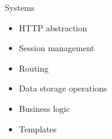 \begin{frame}{Systems}
  \begin{center}
    \begin{itemize}
      \item HTTP abstraction
      \item Session management
      \item Routing
      \item Data storage operations
      \item Business logic
      \item Templates
    \end{itemize}
  \end{center}
\end{frame}